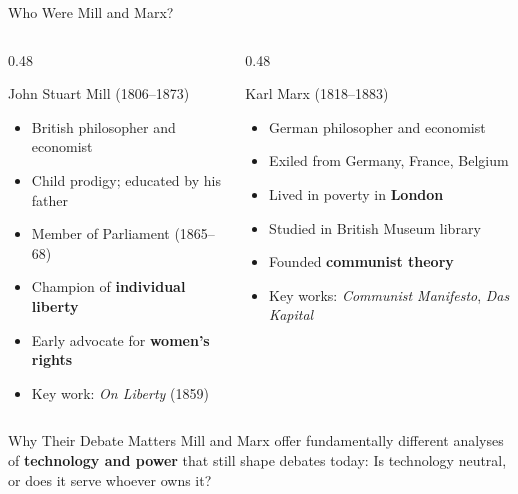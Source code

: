 \documentclass[aspectratio=169]{beamer}
\begin{document}
\begin{frame}{Who Were Mill and Marx?}
\begin{columns}
\begin{column}{0.48\textwidth}
\begin{block}{John Stuart Mill (1806--1873)}
\begin{itemize}
  \item British philosopher and economist
  \item Child prodigy; educated by his father
  \item Member of Parliament (1865--68)
  \item Champion of \textbf{individual liberty}
  \item Early advocate for \textbf{women's rights}
  \item Key work: \textit{On Liberty} (1859)
\end{itemize}
\end{block}
\end{column}

\begin{column}{0.48\textwidth}
\begin{alertblock}{Karl Marx (1818--1883)}
\begin{itemize}
  \item German philosopher and economist
  \item Exiled from Germany, France, Belgium
  \item Lived in poverty in \textbf{London}
  \item Studied in British Museum library
  \item Founded \textbf{communist theory}
  \item Key works: \textit{Communist Manifesto}, \textit{Das Kapital}
\end{itemize}
\end{alertblock}
\end{column}
\end{columns}

\vspace{0.3em}
\begin{exampleblock}{Why Their Debate Matters}
Mill and Marx offer fundamentally different analyses of \textbf{technology and power} that still shape debates today: Is technology neutral, or does it serve whoever owns it?
\end{exampleblock}
\end{frame}
\end{document}
